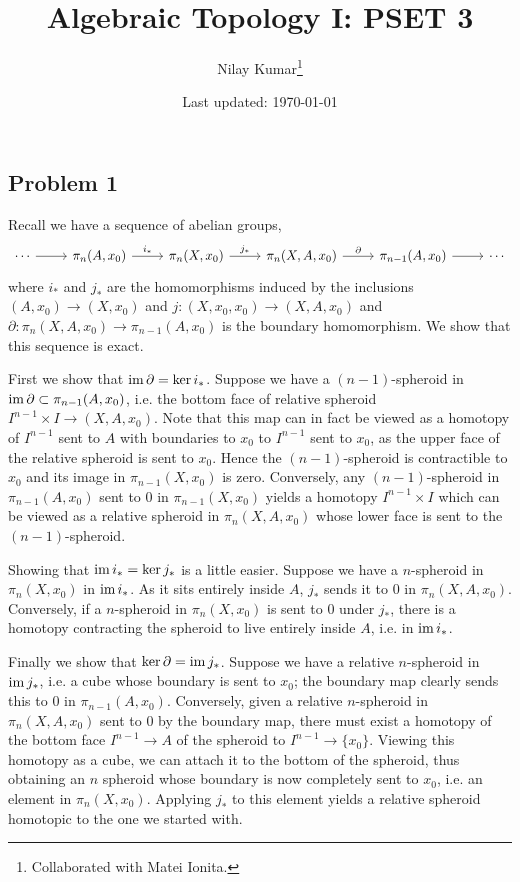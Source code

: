 \documentclass{../mathnotes}
\title{Algebraic Topology I: PSET 3}
\author{Nilay Kumar\footnote{Collaborated with Matei Ionita.}}
\date{Last updated: \today}
\begin{document}
\maketitle

\subsection*{Problem 1}
Recall we have a sequence of abelian groups,
\begin{equation*}
    \begin{tikzcd}
        \cdots\ar{r} & \pi_n(A,x_0)\ar{r}{i_*} & \pi_n(X,x_0)\ar{r}{j_*} & \pi_n(X,A,x_0)\ar{r}{\partial} & \pi_{n-1}(A,x_0)\ar{r} & \cdots
    \end{tikzcd}
\end{equation*}
where $i_*$ and $j_*$ are the homomorphisms induced by the inclusions $(A,x_0)\to(X,x_0)$ and
$j:(X,x_0,x_0)\to(X,A,x_0)$ and $\partial:\pi_n(X,A,x_0)\to \pi_{n-1}(A,x_0)$ is the boundary
homomorphism. We show that this sequence is exact.

First we show that $\operatorname{im}\partial=\ker i_*$.
Suppose we have a $(n-1)$-spheroid in $\operatorname{im}\partial\subset \pi_{n-1}(A,x_0)$, i.e. the bottom
face of relative spheroid $I^{n-1}\times I\to(X,A,x_0)$. Note that this map can in fact be viewed
as a homotopy of $I^{n-1}$ sent to $A$ with boundaries to $x_0$ to $I^{n-1}$ sent to $x_0$, as
the upper face of the relative spheroid is sent to $x_0$. Hence the $(n-1)$-spheroid is contractible
to $x_0$ and its image in $\pi_{n-1}(X,x_0)$ is zero. Conversely, any $(n-1)$-spheroid in $\pi_{n-1}(A,x_0)$
sent to 0 in $\pi_{n-1}(X,x_0)$ yields a homotopy $I^{n-1}\times I$ which can be viewed as a relative
spheroid in $\pi_n(X,A,x_0)$ whose lower face is sent to the $(n-1)$-spheroid.

Showing that $\operatorname{im} i_*=\ker j_*$ is a little easier. Suppose we have a $n$-spheroid in $\pi_n(X,x_0)$ in $\operatorname{im} i_*$.
As it sits entirely inside $A$, $j_*$ sends it to 0 in $\pi_n(X,A,x_0)$. Conversely, if a $n$-spheroid
in $\pi_n(X,x_0)$ is sent to 0 under $j_*$, there is a homotopy contracting the spheroid to live entirely
inside $A$, i.e. in $\operatorname{im} i_*$.

Finally we show that $\ker\partial=\operatorname{im} j_*$. Suppose we have a relative $n$-spheroid in $\operatorname{im} j_*$, i.e.
a cube whose boundary is sent to $x_0$; the boundary map clearly sends this to 0 in $\pi_{n-1}(A,x_0)$.
Conversely, given a relative $n$-spheroid in $\pi_n(X,A,x_0)$ sent to 0 by the boundary map, there must
exist a homotopy of the bottom face $I^{n-1}\to A$ of the spheroid to $I^{n-1}\to \{x_0\}$. Viewing this
homotopy as a cube, we can attach it to the bottom of the spheroid, thus obtaining an $n$ spheroid whose
boundary is now completely sent to $x_0$, i.e. an element in $\pi_n(X,x_0)$. Applying $j_*$ to this element
yields a relative spheroid homotopic to the one we started with.
\end{document}
